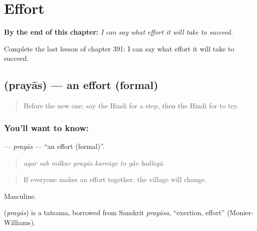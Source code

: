 
\chapter{Effort}
\label{ch:hi-effort}

\begin{chapteropening}
\textbf{By the end of this chapter:} \emph{I can say what effort it will take to succeed.}

Complete the last lesson of chapter 391: I can say what effort it will take to succeed.
\end{chapteropening}

\section[\texorpdfstring{\hi{प्रयास} (prayās)}{प्रयास (prayās)}]{ (prayās) — an effort (formal)}

\label{lesson:HI-C391-prayas}



\begin{quote}
Before the new one: say the Hindi for a step, then the Hindi for to try.
\end{quote}

\subsection*{You'll want to know: }
\textbf{} — \emph{prayās} — \textquotedblleft{}an effort (formal)\textquotedblright{}.

\begin{quote}
       
\end{quote}

\begin{quote}
\emph{agar sab milkar prayās kareṅge to gā̃v badlegā.}
\end{quote}

\begin{quote}
If everyone makes an effort together, the village will change.
\end{quote}

Masculine.

\begin{cousinweb}
\textbf{} (\emph{prayās}) is a tatsama, borrowed from Sanskrit \emph{prayāsa}, \textquotedblleft{}exertion, effort\textquotedblright{} (Monier-Williams).
\end{cousinweb}

